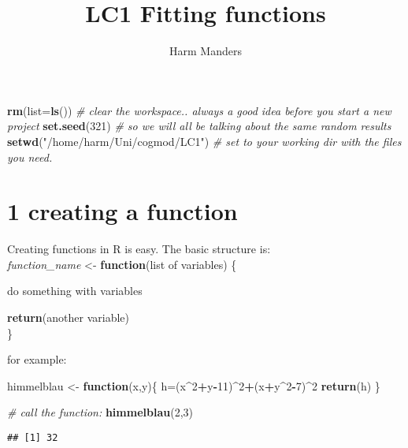 \documentclass[]{article}
\title{LC1 Fitting functions}
\author{Harm Manders}
\date{}
\newenvironment{Shaded}{\begin{snugshade}}{\end{snugshade}}
\newcommand{\KeywordTok}[1]{\textcolor[rgb]{0.13,0.29,0.53}{\textbf{#1}}}
\newcommand{\DataTypeTok}[1]{\textcolor[rgb]{0.13,0.29,0.53}{#1}}
\newcommand{\DecValTok}[1]{\textcolor[rgb]{0.00,0.00,0.81}{#1}}
\newcommand{\StringTok}[1]{\textcolor[rgb]{0.31,0.60,0.02}{#1}}
\newcommand{\CommentTok}[1]{\textcolor[rgb]{0.56,0.35,0.01}{\textit{#1}}}
\newcommand{\ControlFlowTok}[1]{\textcolor[rgb]{0.13,0.29,0.53}{\textbf{#1}}}
\newcommand{\OperatorTok}[1]{\textcolor[rgb]{0.81,0.36,0.00}{\textbf{#1}}}
\newcommand{\NormalTok}[1]{#1}
\begin{document}
\maketitle

\begin{Shaded}
\begin{Highlighting}[]
\KeywordTok{rm}\NormalTok{(}\DataTypeTok{list=}\KeywordTok{ls}\NormalTok{()) }\CommentTok{# clear the workspace.. always a good idea before you start a new project}
\KeywordTok{set.seed}\NormalTok{(}\DecValTok{321}\NormalTok{) }\CommentTok{# so we will all be talking about the same random results}
\KeywordTok{setwd}\NormalTok{(}\StringTok{"/home/harm/Uni/cogmod/LC1"}\NormalTok{) }\CommentTok{# set to your working dir with the files you need. }
\end{Highlighting}
\end{Shaded}

\section{1 creating a function}\label{creating-a-function}

Creating functions in R is easy. The basic structure is:\\
\emph{function\_name} \textless{}- \textbf{function}(list of variables)
\{

do something with variables

\textbf{return}(another variable)\\
\}

for example:

\begin{Shaded}
\begin{Highlighting}[]
\NormalTok{himmelblau <-}\StringTok{ }\ControlFlowTok{function}\NormalTok{(x,y)\{}
\NormalTok{  h=(x}\OperatorTok{^}\DecValTok{2}\OperatorTok{+}\NormalTok{y}\OperatorTok{-}\DecValTok{11}\NormalTok{)}\OperatorTok{^}\DecValTok{2}\OperatorTok{+}\NormalTok{(x}\OperatorTok{+}\NormalTok{y}\OperatorTok{^}\DecValTok{2}\OperatorTok{-}\DecValTok{7}\NormalTok{)}\OperatorTok{^}\DecValTok{2}
  \KeywordTok{return}\NormalTok{(h)}
\NormalTok{\}}

\CommentTok{# call the function:}
\KeywordTok{himmelblau}\NormalTok{(}\DecValTok{2}\NormalTok{,}\DecValTok{3}\NormalTok{)}
\end{Highlighting}
\end{Shaded}

\begin{verbatim}
## [1] 32
\end{verbatim}
\end{document}
